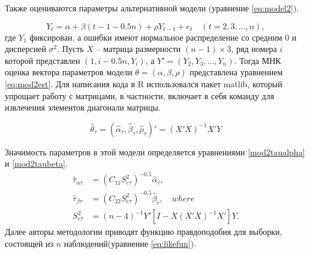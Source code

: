\documentclass[a4paper,12pt]{article}
\begin{document}
Также оцениваются параметры альтернативной модели (уравнение \ref{eq:model2}).

\begin{equation}
  \label{eq:model2}
  Y_t=\alpha+\beta(t-1-0.5n)+\rho Y_{t-1}+e_t\quad (t=2,3,\ldots,n),
\end{equation}
где $Y_1$ фиксирован, а ошибки имеют нормальное распределение со средним 0 и дисперсией $\sigma^2$. Пусть $X$ -- матрица размерности $(n-1)\times 3$, ряд номера $i$ которой представлен $(1, i-0.5n, Y_i)$, а $Y'=(Y_2,Y_3,\ldots,Y_n)$. Тогда МНК оценка вектора параметров модели $\theta=(\alpha,\beta,\rho)$ представлена уравнением \ref{eq:mod2est}. Для написания кода в R использовался пакет matlib, который упрощает работу с матрицами, в частности, включает в себя команду для извлечения элементов диагонали матрицы.

\begin{equation}
  \label{eq:mod2est}
  \hat{\theta}_\tau=(\hat{\alpha}_\tau,\hat{\beta}_\tau,\hat{\rho}_\tau)'=(X'X)^{-1}X'Y
\end{equation}

Значимость параметров в этой модели определяется уравнениями \ref{mod2taualpha} и \ref{mod2taubeta}.
\begin{align}
  \label{mod2taualpha}
  \hat{\tau}_{\alpha\tau}&=(C_{11}S^2_{e\tau})^{-0.5}\hat{\alpha}_\tau,\\
  \label{mod2taubeta}
  \hat{\tau}_{\beta\tau}&=(C_{22}S^2_{e\tau})^{-0.5}\hat{\beta}_\tau,\quad where\\
  S^2_{e\tau}&=(n-4)^{-1}Y'\left[I-X(X'X)^{-1}X'\right]Y.
\end{align}
Далее авторы методологии приводят функцию правдоподобия для выборки, состоящей из $n$ наблюдений(уравнение \ref{eq:likefun}).
\end{document}
